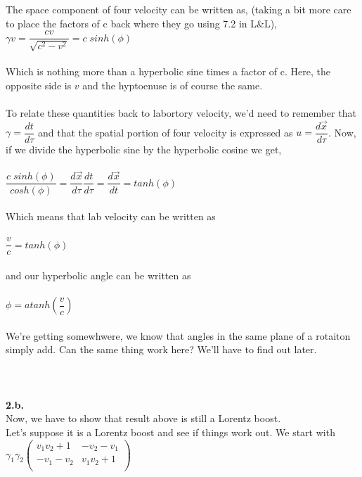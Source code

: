 \documentclass[prb,preprint]
{revtex4-1}
\newcommand{\PRLsep}{\noindent\makebox[\linewidth]{\resizebox{0.8888\linewidth}{2pt}{$\bullet$}}\bigskip}
\begin{document}
\\
\\
The space component of four velocity can be written as, (taking a bit more care to place the factors of c back where they go using 7.2 in L\&L),
\\
$\gamma v = \dfrac{cv}{\sqrt{c^2 - v^2}} = c\;sinh\left(\phi\right)$
\\
\\
Which is nothing more than a hyperbolic sine times a factor of c.  Here, the opposite side is $v$ and the hyptoenuse is of course the same.
\\
\\
To relate these quantities back to labortory velocity, we'd need to remember that $\gamma = \dfrac{dt}{d\tau}$ and that the spatial portion of four velocity is expressed as $u = \dfrac{d\vec{x}}{d\tau}$.  Now, if we divide the hyperbolic sine by the hyperbolic cosine we get, 
\\
\\
$\dfrac{c\;sinh\left(\phi\right)}{cosh\left(\phi\right)} = \dfrac{d\vec{x}}{d\tau} \dfrac{dt}{d\tau} = \dfrac{d\vec{x}}{dt} = tanh\left(\phi\right)$
\\
\\
Which means that lab velocity can be written as
\\
\\
$\dfrac{v}{c} = tanh\left(\phi\right)$
\\
\\
and our hyperbolic angle can be written as 
\\
\\
$\phi = atanh\left(\dfrac{v}{c}\right)$
\\
\\
We're getting somewhwere, we know that angles in the same plane of a rotaiton simply add.  Can the same thing work here?  We'll have to find out later.
\\
\\
\PRLsep
\\
\\
\textbf{2.b.}
\\
Now, we have to show that result above is still a Lorentz boost.
\\
Let's suppose it is a Lorentz boost and see if things work out.  We start with
\\
$\gamma_1 \gamma_2 
\begin{pmatrix}
v_1 v_2 + 1 & -v_2 - v_1\\
-v_1 - v_2 & v_1 v_2 + 1\\
\end{pmatrix} $
\end{document}
